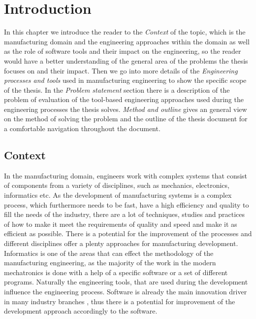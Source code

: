 
\chapter{Introduction}\label{chapter:introduction}


In this chapter we introduce the reader to the \textit{Context} of the topic, which is the manufacturing domain and the engineering approaches within the domain as well as the role of software tools and their impact on the engineering, so the reader would have a better understanding of the general area of the problems the thesis focuses on and their impact. Then we go into more details of the \textit{Engineering processes and tools} used in manufacturing engineering to show the specific scope of the thesis. In the \textit{Problem statement} section there is a description of the problem of evaluation of the tool-based engineering approaches used during the engineering processes the thesis solves.\textit{ Method and outline} gives an general view on the method of solving the problem and the outline of the thesis document for a comfortable navigation throughout the document.

\section{Context}
In the manufacturing domain, engineers work with complex systems that consist of components from a variety of disciplines, such as mechanics, electronics, informatics etc. As the development of manufacturing systems is a complex process, which furthermore needs to be fast, have a high efficiency and quality to fill the needs of the industry, there are a lot of techniques, studies and practices of how to make it meet the requirements of quality and speed and make it as efficient as possible. There is a potential for the improvement of the processes and different disciplines offer a plenty approaches for manufacturing development. \\

Informatics is one of the areas that can effect the methodology of the manufacturing engineering, as the majority of the work in the modern mechatronics is done with a help of a specific software or a set of different programs. Naturally the engineering tools, that are used during the development influence the engineering process. Software is already the main innovation driver in many industry branches \cite{russwurm}, thus there is a potential for improvement of the development approach accordingly to the software.\\

